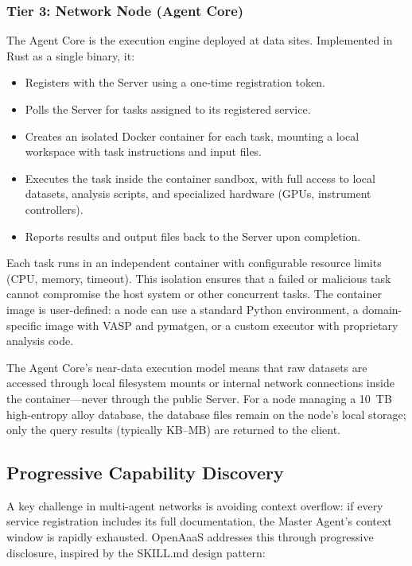 \documentclass{article}
\begin{document}
\subsubsection{Tier 3: Network Node (Agent Core)}

The Agent Core is the execution engine deployed at data sites. Implemented in Rust as a single binary, it:
\begin{itemize}
\item Registers with the Server using a one-time registration token.
\item Polls the Server for tasks assigned to its registered service.
\item Creates an isolated Docker container for each task, mounting a local workspace with task instructions and input files.
\item Executes the task inside the container sandbox, with full access to local datasets, analysis scripts, and specialized hardware (GPUs, instrument controllers).
\item Reports results and output files back to the Server upon completion.
\end{itemize}

Each task runs in an independent container with configurable resource limits (CPU, memory, timeout). This isolation ensures that a failed or malicious task cannot compromise the host system or other concurrent tasks. The container image is user-defined: a node can use a standard Python environment, a domain-specific image with VASP and pymatgen, or a custom executor with proprietary analysis code.

The Agent Core's near-data execution model means that raw datasets are accessed through local filesystem mounts or internal network connections inside the container---never through the public Server. For a node managing a 10~TB high-entropy alloy database, the database files remain on the node's local storage; only the query results (typically KB--MB) are returned to the client.

\subsection{Progressive Capability Discovery}

A key challenge in multi-agent networks is avoiding context overflow: if every service registration includes its full documentation, the Master Agent's context window is rapidly exhausted. OpenAaaS addresses this through progressive disclosure, inspired by the SKILL.md design pattern:
\end{document}
